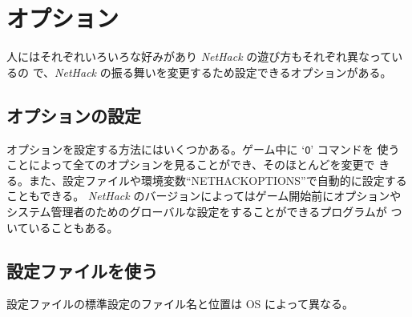 \section{オプション}

人にはそれぞれいろいろな好みがあり {\it NetHack\/} の遊び方もそれぞれ異なっているの
で、{\it NetHack\/} の振る舞いを変更するため設定できるオプションがある。

\subsection*{オプションの設定}

オプションを設定する方法にはいくつかある。ゲーム中に `{\tt O}' コマンドを
使うことによって全てのオプションを見ることができ、そのほとんどを変更で
きる。また、設定ファイルや環境変数``NETHACKOPTIONS''で自動的に設定する
こともできる。
{\it NetHack\/} のバージョンによってはゲーム開始前にオプションや
システム管理者のためのグローバルな設定をすることができるプログラムが
ついていることもある。

\subsection*{設定ファイルを使う}

設定ファイルの標準設定のファイル名と位置は OS によって異なる。\\

